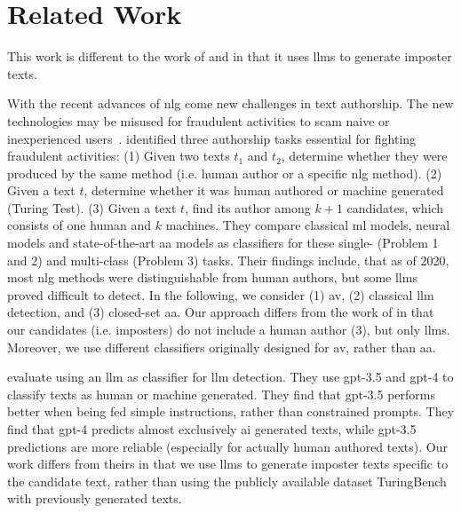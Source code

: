 \chapter{Related Work}
\label{chap:related_work}

This work is different to the work of \cite{koppel_determining_2014} and \cite{kocher_unine_2015} 
in that it uses \acp{llm} to generate imposter texts.


With the recent advances of \ac{nlg} come new challenges in text authorship.
The new technologies may be misused for fraudulent activities to scam naive or inexperienced users~\cite{uchendu_authorship_2020,bhattacharjee_fighting_2024}.
\citet{uchendu_authorship_2020} identified three authorship tasks essential for fighting fraudulent activities:
(1) Given two texts $t_1$ and $t_2$, determine whether they were produced by the same method (i.e. human author or a specific \ac{nlg} method).
(2) Given a text $t$, determine whether it was human authored or machine generated (Turing Test).
(3) Given a text $t$, find its author among $k+1$ candidates, which consists of one human and $k$ machines.
They compare classical \ac{ml} models, neural models and state-of-the-art \ac{aa} models as classifiers 
for these single- (Problem 1 and 2) and multi-class (Problem 3) tasks.
Their findings include, that as of 2020, most \ac{nlg} methods were distinguishable from human authors, 
but some \acp{llm} proved difficult to detect.
In the following, we consider (1) \ac{av}, (2) classical \ac{llm} detection, and (3) closed-set \ac{aa}.
Our approach differs from the work of \citet{uchendu_authorship_2020} in that our candidates (i.e. imposters) do not include a human author (3), 
but only \acp{llm}.
Moreover, we use different classifiers originally designed for \ac{av}, rather than \ac{aa}.

\citet{bhattacharjee_fighting_2024} evaluate using an \ac{llm} as classifier for \ac{llm} detection.
They use \ac{gpt}-3.5 and \ac{gpt}-4 to classify texts as human or machine generated.
They find that \ac{gpt}-3.5 performs better when being fed simple instructions, rather than constrained prompts.
They find that \ac{gpt}-4 predicts almost exclusively \ac{ai} generated texts, while \ac{gpt}-3.5 predictions are more reliable (especially for actually human authored texts).
Our work differs from theirs in that we use \acp{llm} to generate imposter texts specific to the candidate text, 
rather than using the publicly available dataset TuringBench with previously generated texts.

